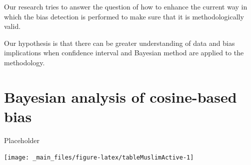 \documentclass[12pt,]{book}
\newenvironment{Shaded}{\begin{snugshade}}{\end{snugshade}}
\newcommand{\KeywordTok}[1]{\textcolor[rgb]{0.13,0.29,0.53}{\textbf{#1}}}
\newcommand{\DecValTok}[1]{\textcolor[rgb]{0.00,0.00,0.81}{#1}}
\newcommand{\StringTok}[1]{\textcolor[rgb]{0.31,0.60,0.02}{#1}}
\newcommand{\CommentTok}[1]{\textcolor[rgb]{0.56,0.35,0.01}{\textit{#1}}}
\newcommand{\OperatorTok}[1]{\textcolor[rgb]{0.81,0.36,0.00}{\textbf{#1}}}
\newcommand{\NormalTok}[1]{#1}
\begin{document}
Our research tries to answer the question of how to enhance the current way in which the bias detection is performed to make sure that it is
methodologically valid.

Our hypothesis is that there can be greater understanding of data and bias implications when confidence interval and Bayesian method are applied to the
methodology.

\hypertarget{bayesian-analysis-of-cosine-based-bias}{%
\chapter{Bayesian analysis of cosine-based bias}\label{bayesian-analysis-of-cosine-based-bias}}

Placeholder

\begin{Shaded}
\end{Shaded}

\begin{center}\texttt{[image: \_main\_files/figure-latex/tableMuslimActive-1]} \end{center}
\end{document}
